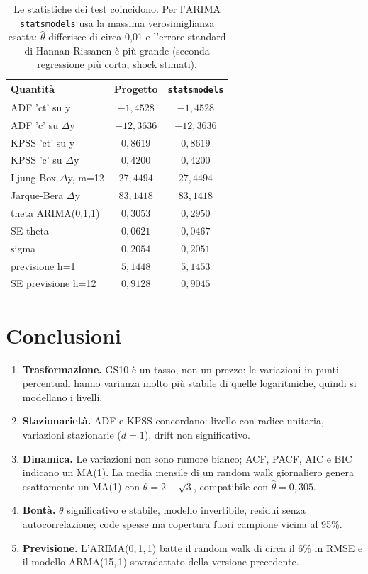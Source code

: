 \documentclass[11pt,a4paper]{article}
\begin{document}
\begin{table}[H]
\centering
\begin{tabular}{lcc}
\toprule
Quantità & Progetto & \texttt{statsmodels} \\
\midrule
ADF 'ct' su y & $-1{,}4528$ & $-1{,}4528$ \\
ADF 'c' su $\Delta$y & $-12{,}3636$ & $-12{,}3636$ \\
KPSS 'ct' su y & $0{,}8619$ & $0{,}8619$ \\
KPSS 'c' su $\Delta$y & $0{,}4200$ & $0{,}4200$ \\
Ljung-Box $\Delta$y, m=12 & $27{,}4494$ & $27{,}4494$ \\
Jarque-Bera $\Delta$y & $83{,}1418$ & $83{,}1418$ \\
theta ARIMA(0,1,1) & $0{,}3053$ & $0{,}2950$ \\
SE theta & $0{,}0621$ & $0{,}0467$ \\
sigma & $0{,}2054$ & $0{,}2051$ \\
previsione h=1 & $5{,}1448$ & $5{,}1453$ \\
SE previsione h=12 & $0{,}9128$ & $0{,}9045$ \\
\bottomrule
\end{tabular}
\caption{Le statistiche dei test coincidono. Per l'ARIMA \texttt{statsmodels} usa la massima verosimiglianza esatta: $\hat\theta$ differisce di circa 0,01 e l'errore standard di Hannan-Rissanen è più grande (seconda regressione più corta, shock stimati).}
\end{table}

\section{Conclusioni}

\begin{enumerate}
\item \textbf{Trasformazione.} GS10 è un tasso, non un prezzo: le variazioni in punti percentuali hanno varianza molto più stabile di quelle logaritmiche, quindi si modellano i livelli.
\item \textbf{Stazionarietà.} ADF e KPSS concordano: livello con radice unitaria, variazioni stazionarie ($d = 1$), drift non significativo.
\item \textbf{Dinamica.} Le variazioni non sono rumore bianco; ACF, PACF, AIC e BIC indicano un MA(1). La media mensile di un random walk giornaliero genera esattamente un MA(1) con $\theta = 2-\sqrt3$, compatibile con $\hat\theta = 0{,}305$.
\item \textbf{Bontà.} $\theta$ significativo e stabile, modello invertibile, residui senza autocorrelazione; code spesse ma copertura fuori campione vicina al 95\%.
\item \textbf{Previsione.} L'ARIMA(0,\,1,\,1) batte il random walk di circa il 6\% in RMSE e il modello ARMA(15,\,1) sovradattato della versione precedente.
\end{enumerate}
\end{document}

